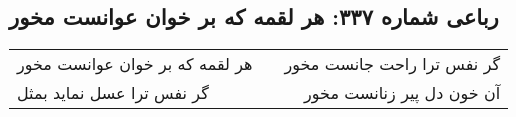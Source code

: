 \begin{center}
\section*{رباعی شماره ۳۳۷: هر لقمه که بر خوان عوانست مخور}
\label{sec:sh337}
\begin{longtable}{l p{0.5cm} r}
هر لقمه که بر خوان عوانست مخور
&&
گر نفس ترا راحت جانست مخور
\\
گر نفس ترا عسل نماید بمثل
&&
آن خون دل پیر زنانست مخور
\\
\end{longtable}
\end{center}
